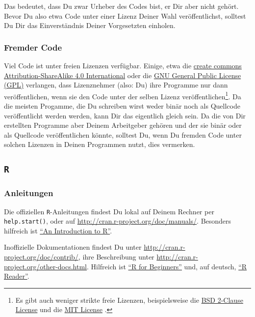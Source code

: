 \documentclass[twoside]{scrartcl}
\providecommand{\R}{\texttt{R}}
\providecommand{\code}[1]{\texttt{#1}}
\begin{document}
Das bedeutet, dass Du zwar Urheber des Codes bist, er Dir aber nicht
geh\"o{}rt. Bevor Du also etwa Code unter einer Lizenz Deiner Wahl
ver\"o{}ffentlichst, solltest Du Dir das Einverst\"a{}ndnis Deiner Vorgesetzten 
einholen.

\subsubsection{Fremder Code\label{sec:copy_foreign}}
Viel Code ist unter freien Lizenzen verf\"u{}gbar. Einige, etwa die
\href{https://creativecommons.org/licenses/by-sa/4.0/legalcode}{create commons
Attribution-ShareAlike 4.0 International} oder die
\href{http://www.gnu.org/licenses/gpl-3.0.html}{GNU General Public License
(GPL)} verlangen, dass Lizenznehmer (also: Du) ihre Programme nur dann
ver\"o{}ffentlichen, wenn sie den Code unter der selben Lizenz
ver\"o{}ffentlichen\footnote{Es gibt auch weniger strikte freie Lizenzen,
beispielsweise die 
\href{http://opensource.org/licenses/BSD-2-Clause}{BSD 2-Clause License} und
die 
\href{http://opensource.org/licenses/MIT}{MIT License}%
. }.
Da die meisten Progamme, die Du schreiben wirst weder bin\"a{}r noch als
Quellcode ver\"o{}ffentlicht werden werden, kann Dir das eigentlich gleich sein.
Da die von Dir erstellten Programme aber Deinem Arbeitgeber geh\"o{}ren und der
sie bin\"a{}r oder als Quellcode ver\"o{}ffentlichen k\"o{}nnte, solltest Du,
wenn Du fremden Code unter solchen Lizenzen in Deinen Programmen nutzt, dies
vermerken.
\subsection{\R{}}
\subsubsection{Anleitungen}
Die offiziellen  \R{}-Anleitungen findest Du lokal auf Deinem Rechner per 
\code{help.start()}, oder auf \url{http://cran.r-project.org/doc/manuals/}.
Besonders hilfreich ist 
\href{http://cran.r-project.org/doc/manuals/r-release/R-intro.pdf}
{"`An Introduction to R"'}.

Inoffizielle Dokumentationen findest Du unter 
\url{http://cran.r-project.org/doc/contrib/}, ihre Beschreibung unter 
\url{http://cran.r-project.org/other-docs.html}. Hilfreich ist 
\href{http://cran.r-project.org/doc/contrib/Paradis-rdebuts_en.pdf}
{"`R for Beginners"'} 
und, auf deutsch, 
\href{http://cran.r-project.org/doc/contrib/Grosz+Peters-R-Reader.pdf}
{"`R Reader"'}.
\end{document}
